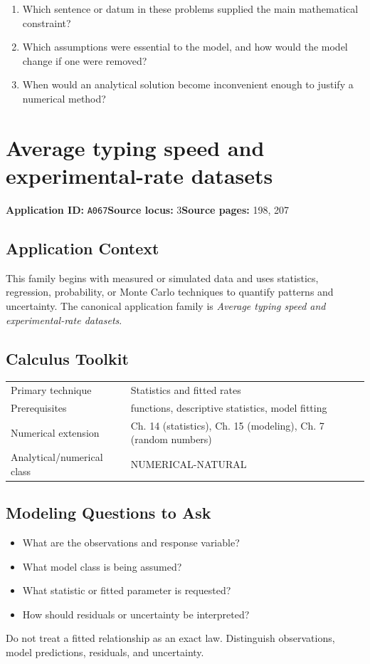 \documentclass[11pt]{book}
\newcommand{\pid}[1]{\texttt{#1}}
\begin{document}
\begin{reflectionbox}\begin{enumerate}
\item Which sentence or datum in these problems supplied the main mathematical constraint?
\item Which assumptions were essential to the model, and how would the model change if one were removed?
\item When would an analytical solution become inconvenient enough to justify a numerical method?
\end{enumerate}\end{reflectionbox}
\chapter{Average typing speed and experimental-rate datasets}\label{app:A067}
\textbf{Application ID:} \pid{A067}\quad \textbf{Source locus:} 3\quad \textbf{Source pages:} 198, 207
\section*{Application Context}
This family begins with measured or simulated data and uses statistics, regression, probability, or Monte Carlo techniques to quantify patterns and uncertainty. The canonical application family is \emph{Average typing speed and experimental-rate datasets}.
\section*{Calculus Toolkit}
\begin{tabularx}{\textwidth}{@{}lX@{}}\toprule
Primary technique & Statistics and fitted rates \\
Prerequisites & functions, descriptive statistics, model fitting \\
Numerical extension & Ch. 14 (statistics), Ch. 15 (modeling), Ch. 7 (random numbers) \\
Analytical/numerical class & NUMERICAL-NATURAL \\
\bottomrule\end{tabularx}
\section*{Modeling Questions to Ask}\begin{itemize}
\item What are the observations and response variable?
\item What model class is being assumed?
\item What statistic or fitted parameter is requested?
\item How should residuals or uncertainty be interpreted?
\end{itemize}
\begin{errorbox}Do not treat a fitted relationship as an exact law. Distinguish observations, model predictions, residuals, and uncertainty.\end{errorbox}
\end{document}
